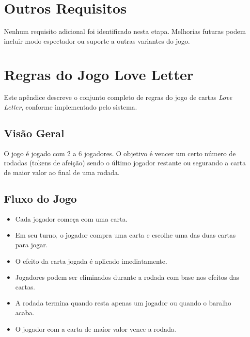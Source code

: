 \documentclass{scrreprt}
\begin{document}
\chapter{Outros Requisitos}
Nenhum requisito adicional foi identificado nesta etapa. Melhorias futuras podem incluir modo espectador ou suporte a outras variantes do jogo.

\appendix
\chapter{Regras do Jogo Love Letter} \label{appendix:rules}

Este apêndice descreve o conjunto completo de regras do jogo de cartas \textit{Love Letter}, conforme implementado pelo sistema.

\section{Visão Geral}
O jogo é jogado com 2 a 6 jogadores. O objetivo é vencer um certo número de rodadas (tokens de afeição) sendo o último jogador restante ou segurando a carta de maior valor ao final de uma rodada.

\section{Fluxo do Jogo}
\begin{itemize}
    \item Cada jogador começa com uma carta.
    \item Em seu turno, o jogador compra uma carta e escolhe uma das duas cartas para jogar.
    \item O efeito da carta jogada é aplicado imediatamente.
    \item Jogadores podem ser eliminados durante a rodada com base nos efeitos das cartas.
    \item A rodada termina quando resta apenas um jogador ou quando o baralho acaba.
    \item O jogador com a carta de maior valor vence a rodada.
\end{itemize}
\end{document}
